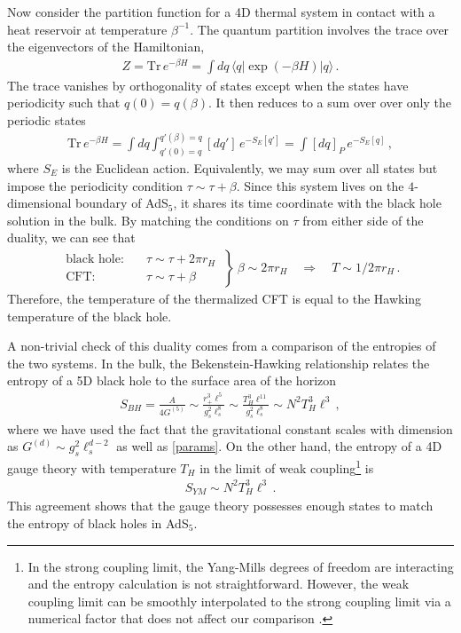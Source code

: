\documentclass[../PhD.tex]{subfiles}
\begin{document}
Now consider the partition function for a 4D thermal system in contact with a heat reservoir at temperature $\beta^{-1}$. The quantum partition involves the trace over the eigenvectors of the Hamiltonian,
\begin{align}
\label{quantum par}
Z = \text{Tr} \, e^{- \beta H} = \int dq \, \langle q | \exp ( - \beta H ) | q \rangle \, .
\end{align}
The trace vanishes by orthogonality of states except when the states have periodicity such that $q(0) = q(\beta)$. It then reduces to a sum over over only the periodic states \cite{Schellekens}
\begin{align}
\label{cft trace}
\text{Tr} \, e^{ - \beta H} = \int dq \int^{q'(\beta)=q}_{q'(0)=q} [dq'] \, e^{-S_E[q']} = \int [dq]_P \, e^{-S_E[q]} \, ,
\end{align}
where $S_E$ is the Euclidean action. Equivalently, we may sum over all states but impose the periodicity condition $\tau \sim \tau + \beta$. Since this system lives on the $4$-dimensional boundary of AdS$_{5}$, it shares its time coordinate with the black hole solution in the bulk. By matching the conditions on $\tau$ from either side of the duality, we can see that 
\begin{align}
\label{temp/grav}
\left. \begin{aligned}
	\text{black hole:} &\quad \tau \sim \tau + 2\pi r_H \\
	\text{CFT:} &\quad \tau \sim \tau + \beta
	\end{aligned}
\: \right\} \: \beta \sim 2\pi r_H \quad \Rightarrow \quad T \sim 1/ 2\pi r_H \, .
\end{align}
Therefore, the temperature of the thermalized CFT is equal to the Hawking temperature of the black hole.

A non-trivial check of this duality comes from a comparison of the entropies of the two systems. In the bulk, the Bekenstein-Hawking relationship relates the entropy of a 5D black hole to the surface area of the horizon \cite{Bekenstein:1973ur}
\begin{align}
\label{bh dual entropy}
S_{BH} = \frac{A}{4G^{(5)}} \sim \frac{r_+^3 \ell^5}{g_s^2 \ell_s^8} \sim \frac{T_H^3 \ell^{11}}{g_s^2 \ell_s^8} \sim N^2 T_H^3 \ell^3 \, ,
\end{align}
where we have used the fact that the gravitational constant scales with dimension as $G^{(d)} \sim g_s^2 \ell_s^{d-2}$ as well as \eqref{params}. On the other hand, the entropy of a 4D gauge theory with temperature $T_H$ in the limit of weak coupling\footnote{In the strong coupling limit, the Yang-Mills degrees of freedom are interacting and the entropy calculation is not straightforward. However, the weak coupling limit can be smoothly interpolated to the strong coupling limit via a numerical factor that does not affect our comparison \cite{gr-qc/0602037}.} is
\begin{align}
\label{gauge dual entropy}
S_{YM} \sim N^2 T_H^3 \ell^3 \, .
\end{align}
This agreement shows that the gauge theory possesses enough states to match the entropy of black holes in AdS$_5$.
\end{document}
